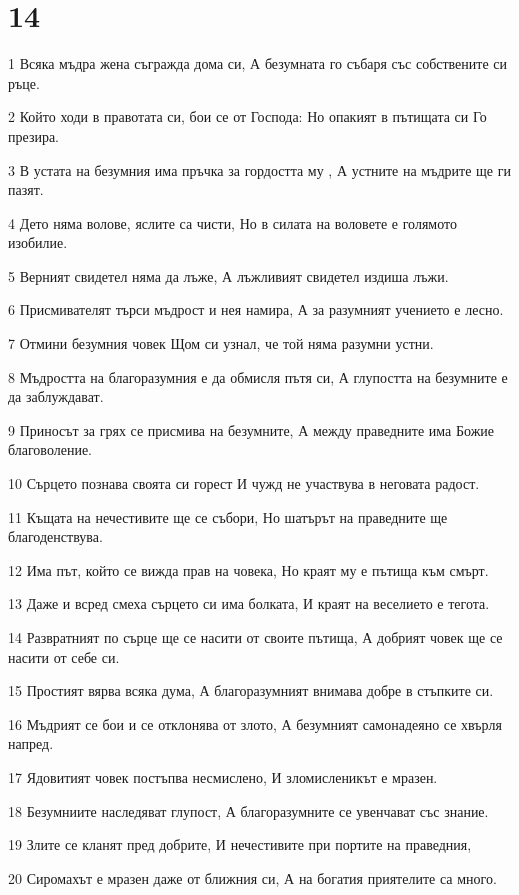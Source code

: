 \chapter{14}

\par 1 Всяка мъдра жена съгражда дома си, А безумната го събаря със собствените си ръце.
\par 2 Който ходи в правотата си, бои се от Господа: Но опакият в пътищата си Го презира.
\par 3 В устата на безумния има пръчка за гордостта му , А устните на мъдрите ще ги пазят.
\par 4 Дето няма волове, яслите са чисти, Но в силата на воловете е голямото изобилие.
\par 5 Верният свидетел няма да лъже, А лъжливият свидетел издиша лъжи.
\par 6 Присмивателят търси мъдрост и нея намира, А за разумният учението е лесно.
\par 7 Отмини безумния човек Щом си узнал, че той няма разумни устни.
\par 8 Мъдростта на благоразумния е да обмисля пътя си, А глупостта на безумните е да заблуждават.
\par 9 Приносът за грях се присмива на безумните, А между праведните има Божие благоволение.
\par 10 Сърцето познава своята си горест И чужд не участвува в неговата радост.
\par 11 Къщата на нечестивите ще се събори, Но шатърът на праведните ще благоденствува.
\par 12 Има път, който се вижда прав на човека, Но краят му е пътища към смърт.
\par 13 Даже и всред смеха сърцето си има болката, И краят на веселието е тегота.
\par 14 Развратният по сърце ще се насити от своите пътища, А добрият човек ще се насити от себе си.
\par 15 Простият вярва всяка дума, А благоразумният внимава добре в стъпките си.
\par 16 Мъдрият се бои и се отклонява от злото, А безумният самонадеяно се хвърля напред.
\par 17 Ядовитият човек постъпва несмислено, И зломисленикът е мразен.
\par 18 Безумниите наследяват глупост, А благоразумните се увенчават със знание.
\par 19 Злите се кланят пред добрите, И нечестивите при портите на праведния,
\par 20 Сиромахът е мразен даже от ближния си, А на богатия приятелите са много.
